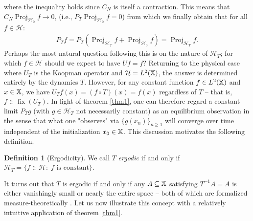 \documentclass[11pt]{report}
\newcommand{\mc}[1]{\mathcal{#1}}
\newcommand{\1}[1]{\mathbbm{1}_{\{#1\}}}
\DeclareMathOperator{\fix}{fix}
\DeclareMathOperator{\proj}{Proj}
\theoremstyle{definition}
\newtheorem{definition}{Definition}
\begin{document}
    where the inequality holds since $C_N$ is itself a contraction. This means that
    $C_N\proj_{\mc{H}_0}f\rightarrow 0$, (i.e., $P_T\proj_{\mc{H}_0}f=0$) from
    which we finally obtain that for all $f\in\mc{H}$:
    \begin{align*}
        P_Tf=P_T(\proj_{\mc{H}_T}f+\proj_{\mc{H}_0}f)=\proj_{\mc{H}_T}f.\tag*{$\qed$}
    \end{align*}
    \indent Perhaps the most natural question following this is on the nature of
    $\mc{H}_T$; for which $f\in\mc{H}$ should we expect to have $Uf=f$?
    Returning to the physical case where $U_T$ is the Koopman operator and
    $\mc{H}=L^2(\mbb{X})$, the answer is determined entirely by the dynamics
    $T$. However, for any constant function $f\in L^2(\mathbb{X})$ and
    $x\in\mathbb{X}$, we have $U_Tf(x)=(f\circ T)(x)=f(x)$ regardless of $T$ --
    that is, $f\in\fix(U_T)$. In light of theorem \ref{thm1}, one can therefore
    regard a constant limit $P_Tg$ (with $g\in\mc{H}_T$ not necessarily constant) as an equilibrium observation in the sense that what
    one "observes" via $\{g(x_n)\}_{n\geq 1}$ will converge over time independent of the initialization $x_0\in\mathbb{X}$. This discussion motivates the following definition.
    \begin{definition}[Ergodicity]\label{def2} We call $T$ \textit{ergodic} if
        and only if $\mc{H}_T=\{f\in\mc{H}:\;\text{$f$ is constant}\}$.
    \end{definition}
    It turns out that $T$ is ergodic if and only if any $A\subseteq\mathbb{X}$
    satisfying $T^{-1}A=A$ is either vanishingly small or nearly the entire
    space -- both of which are formalized measure-theoretically \cite[$\S$II.5,
    p.59]{Reed_Simon_1972}. Let us now illustrate this concept with a relatively
    intuitive application of theorem \ref{thm1}.
\end{document}
